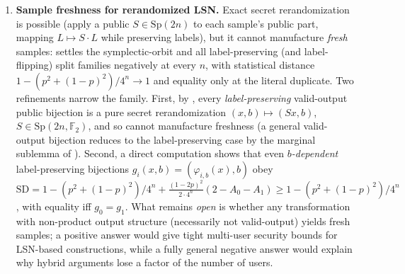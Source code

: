 \documentclass[11pt,a4paper]{article}
\theoremstyle{plain}
\theoremstyle{definition}
\newcommand{\F}{\mathbb{F}}
\begin{document}
\begin{enumerate}
\item \textbf{Sample freshness for rerandomized LSN.} Exact secret rerandomization is possible (apply a public $S \in \mathrm{Sp}(2n)$ to each sample's public part, mapping $L \mapsto S\cdot L$ while preserving labels), but it cannot manufacture \emph{fresh} samples:  settles the symplectic-orbit and all label-preserving (and label-flipping) split families negatively at every $n$, with statistical distance $1 - (p^2+(1-p)^2)/4^n \to 1$ and equality only at the literal duplicate. Two refinements narrow the family. First, by , every \emph{label-preserving} valid-output public bijection is a pure secret rerandomization $(x,b)\mapsto(Sx,b)$, $S\in\mathrm{Sp}(2n,\F_2)$, and so cannot manufacture freshness (a general valid-output bijection reduces to the label-preserving case by the marginal sublemma of ). Second, a direct computation shows that even \emph{$b$-dependent} label-preserving bijections $g_i(x,b)=(\varphi_{i,b}(x),b)$ obey $\mathrm{SD} = 1 - (p^2+(1-p)^2)/4^n + \tfrac{(1-2p)^2}{2\cdot 4^n}(2 - A_0 - A_1) \ge 1 - (p^2+(1-p)^2)/4^n$, with equality iff $g_0=g_1$. What remains \emph{open} is whether any transformation with non-product output structure (necessarily not valid-output) yields fresh samples; a positive answer would give tight multi-user security bounds for LSN-based constructions, while a fully general negative answer would explain why hybrid arguments lose a factor of the number of users.


\end{enumerate}
\end{document}
